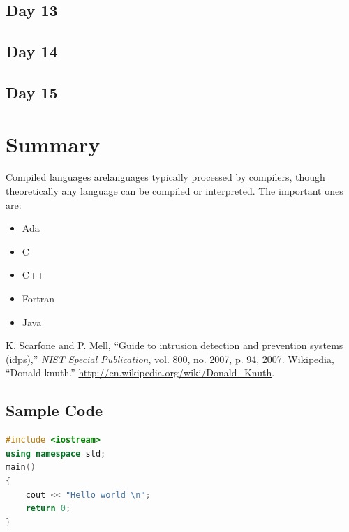 \documentclass{fisattraining}
\begin{document}
\section{Day 13}

\section{Day 14}

\section{Day 15}

\chapter{Summary}

Compiled languages arelanguages typically processed by compilers, though theoretically any language can be compiled or interpreted. The important ones are:
\begin{itemize}
\item Ada
\item C
\item C++
\item Fortran
\item Java
\end{itemize}



\begin{thebibliography}{1}
 K. Scarfone and P. Mell, ``Guide to intrusion detection and prevention systems
(idps),'' \textit{NIST Special Publication}, vol. 800, no. 2007, p. 94, 2007.
 Wikipedia, ``Donald knuth.'' \url{http://en.wikipedia.org/wiki/Donald_Knuth}.
\end{thebibliography}

\begin{appendices}
\chapter{Sample Code}
\begin{lstlisting}[language=c++]
#include <iostream>
using namespace std;
main()
{
	cout << "Hello world \n";
	return 0;
}
\end{lstlisting}
\end{appendices}
\end{document}
